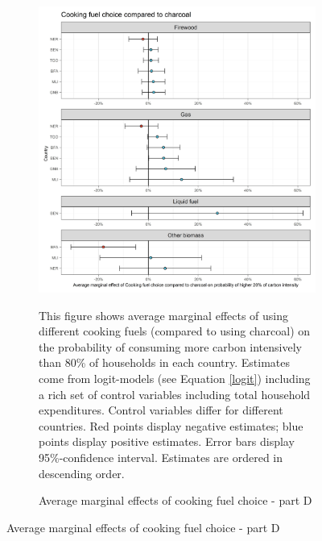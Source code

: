  \begin{figure}[ht!]\ContinuedFloat
   \centering
   \begin{subfigure}[b]{\textwidth}
   \centering
   \caption{Average marginal effects of cooking fuel choice - part D} \label{fig:Logit_ME_CF_4}
   \includegraphics{1_Figures/Analysis_Logit_Models_Marginal_Effects/Average_Marginal_Effects_affected_upper_80_CF_Charcoal_2017.jpg}
   \begin{subcaption2}
     This figure shows average marginal effects of using different cooking fuels (compared to using charcoal) on the probability of consuming more carbon intensively than 80\% of households in each country. Estimates come from logit-models (see Equation \ref{logit}) including a rich set of control variables including total household expenditures. Control variables differ for different countries. Red points display negative estimates; blue points display positive estimates. Error bars display 95\%-confidence interval. Estimates are ordered in descending order.
   \end{subcaption2}
   \end{subfigure}
 \end{figure}
 \clearpage
